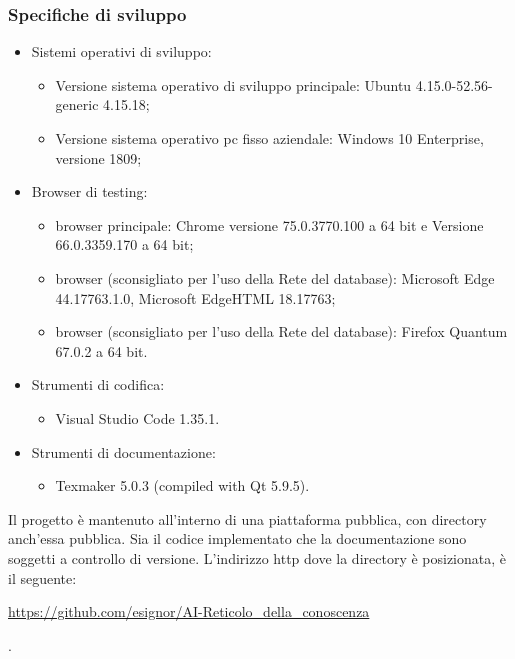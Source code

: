 \subsubsection{Specifiche di sviluppo}
\label{Specifiche di sviluppo}
\begin{itemize}
\item Sistemi operativi di sviluppo:
\begin{itemize}
\item Versione sistema operativo di sviluppo principale: Ubuntu 4.15.0-52.56-generic 4.15.18;
\item Versione sistema operativo pc fisso aziendale: Windows 10 Enterprise, versione 1809;
\end{itemize}
\item Browser di testing:
\begin{itemize}
\item browser principale: Chrome versione 75.0.3770.100 a 64 bit e Versione 66.0.3359.170 a 64 bit;
\item browser (sconsigliato per l'uso della Rete del database): Microsoft Edge 44.17763.1.0, Microsoft EdgeHTML 18.17763;
\item browser (sconsigliato per l'uso della Rete del database): Firefox Quantum 67.0.2 a 64 bit.
\end{itemize}
\item Strumenti di codifica:
\begin{itemize}
\item Visual Studio Code 1.35.1.
\end{itemize}
\item Strumenti di documentazione:
\begin{itemize}
\item Texmaker 5.0.3 (compiled with Qt 5.9.5).
\end{itemize}
\end{itemize}
\noindent
Il progetto \`e mantenuto all'interno di una piattaforma pubblica, con directory anch'essa pubblica. Sia il codice implementato che la documentazione sono soggetti a controllo di versione.  L'indirizzo http dove la directory \` e posizionata, \`e il seguente:
\begin{center}\url{https://github.com/esignor/AI-Reticolo_della_conoscenza}\end{center}.